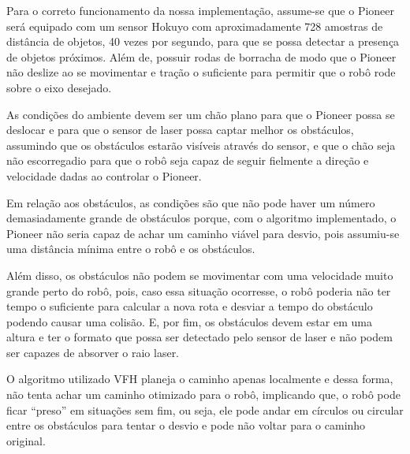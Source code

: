 Para o correto funcionamento da nossa implementação, assume-se que o Pioneer 
será equipado com um sensor Hokuyo com aproximadamente 728 amostras de distância 
de objetos, 40 vezes por segundo, para que se possa detectar a presença de 
objetos próximos. Além de, possuir rodas de borracha de modo que o Pioneer não 
deslize ao se movimentar e tração o suficiente para permitir que o robô rode 
sobre o eixo desejado.

As condições do ambiente devem ser um chão plano para que o Pioneer possa se 
deslocar e para que o sensor de laser possa captar melhor os obstáculos, 
assumindo que os obstáculos estarão visíveis através do sensor, e que o chão 
seja não escorregadio para que o robô seja capaz de seguir fielmente a direção 
e velocidade dadas ao controlar o Pioneer.

Em relação aos obstáculos, as condições são que não pode haver um número 
demasiadamente grande de obstáculos porque, com o algoritmo implementado, o 
Pioneer não seria capaz de achar um caminho viável para desvio, pois assumiu-se 
uma distância mínima entre o robô e os obstáculos. 

Além disso, os obstáculos não podem se movimentar com uma velocidade muito 
grande perto do robô, pois, caso essa situação ocorresse, o robô poderia não ter
tempo o suficiente para calcular a nova rota e desviar a tempo do obstáculo 
podendo causar uma colisão. E, por fim, os obstáculos devem estar em uma altura
e ter o formato que possa ser detectado pelo sensor de laser e não podem ser 
capazes de absorver o raio laser.

O algoritmo utilizado VFH planeja o caminho apenas localmente e dessa forma, 
não tenta achar um caminho otimizado para o robô, implicando que, o robô pode 
ficar “preso” em situações sem fim, ou seja, ele pode andar em círculos ou 
circular entre os obstáculos para tentar o desvio e pode não voltar para o 
caminho original.
